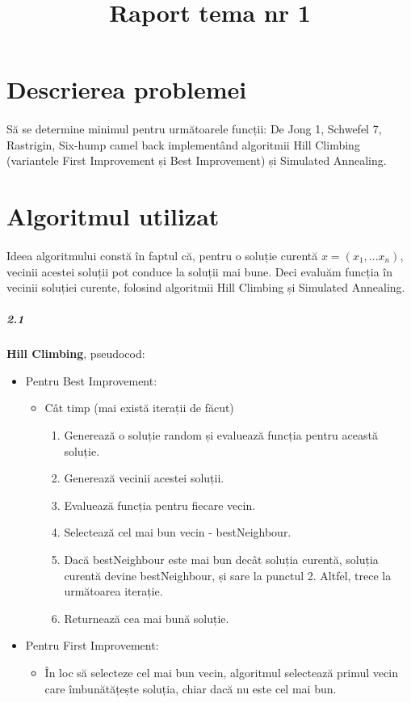 \documentclass[paper=a4, fontsize=11pt]{scrartcl}
\date{}
\title{\textbf{Raport tema nr 1}}
\begin{document}
\maketitle
\vspace{-7em}
\section{Descrierea problemei}
\paragraph{}
Să se determine minimul pentru următoarele funcții: De Jong 1, Schwefel 7, Rastrigin, Six-hump camel back implementând algoritmii Hill Climbing (variantele First Improvement și Best Improvement) și Simulated Annealing. 

\section{Algoritmul utilizat}
\paragraph{}
Ideea algoritmului constă în faptul că, pentru o soluție curentă $x=(x_1,...x_n)$, vecinii acestei soluții pot conduce la soluții mai bune. Deci evaluăm funcția în vecinii soluției curente, folosind algoritmii Hill Climbing și Simulated Annealing.
\subparagraph{2.1}
\textbf{Hill Climbing}, pseudocod:

\begin{itemize}
    \item[] Pentru Best Improvement:
    \begin{itemize}
        \item[] Cât timp (mai există iterații de făcut)
        \begin{enumerate}
            \item Generează o soluție random și evaluează funcția pentru această soluție.
            \item Generează vecinii acestei soluții.
            \item Evaluează funcția pentru fiecare vecin.
            \item Selectează cel mai bun vecin - bestNeighbour.
            \item Dacă bestNeighbour este mai bun decât soluția curentă, soluția curentă devine bestNeighbour, și sare la punctul 2. Altfel, trece la următoarea iterație.
            \item Returnează cea mai bună soluție.
        \end{enumerate} 
    \end{itemize}
    \item[] Pentru First Improvement: 
    \begin{itemize}
        \item[] În loc să selecteze cel mai bun vecin, algoritmul selectează primul vecin care îmbunătățește soluția, chiar dacă nu este cel mai bun.
    \end{itemize} 
\end{itemize}
\end{document}
